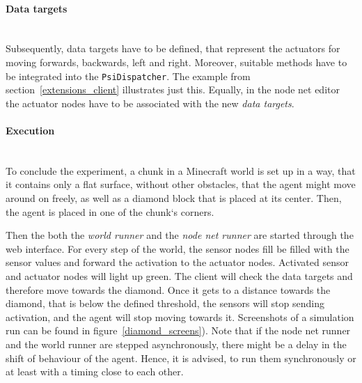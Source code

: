 \paragraph{Data targets}$\;$ \\

Subsequently, data targets have to be defined, that represent the actuators for moving forwards, backwards, left and right. Moreover, suitable methods have to be integrated into the \texttt{PsiDispatcher}. The example from section~\ref{extensions_client} illustrates just this. Equally, in the node net editor the actuator nodes have to be associated with the new \emph{data targets}.

\paragraph{Execution}$\;$ \\

To conclude the experiment, a chunk in a Minecraft world is set up in a way, that it contains only a flat surface, without other obstacles, that the agent might move around on freely, as well as a diamond block that is placed at its center. Then, the agent is placed in one of the chunk`s corners.

Then the both the \emph{world runner} and the \emph{node net runner} are started through the web interface. For every step of the world, the sensor nodes fill be filled with the sensor values and forward the activation to the actuator nodes. Activated sensor and actuator nodes will light up green. The client will check the data targets and therefore move towards the diamond. Once it gets to a distance towards the diamond, that is below the defined threshold, the sensors will stop sending activation, and the agent will stop moving towards it. Screenshots of a simulation run can be found in figure~\ref{diamond_screens}). Note that if the node net runner and the world runner are stepped asynchronously, there might be a delay in the shift of behaviour of the agent. Hence, it is advised, to run them synchronously or at least with a timing close to each other.

